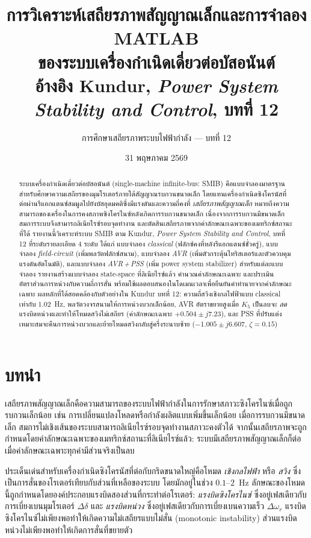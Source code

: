 \documentclass[12pt,a4paper]{article}
\title{\textbf{การวิเคราะห์เสถียรภาพสัญญาณเล็กและการจำลอง MATLAB\\
ของระบบเครื่องกำเนิดเดี่ยวต่อบัสอนันต์}\\
\large อ้างอิง Kundur, \textit{Power System Stability and Control}, บทที่ 12}
\author{การศึกษาเสถียรภาพระบบไฟฟ้ากำลัง --- บทที่ 12}
\date{31 พฤษภาคม 2569}
\newcommand{\dwr}{\Delta\omega_r}
\newcommand{\ddel}{\Delta\delta}
\begin{document}
\maketitle
\thispagestyle{empty}

\begin{abstract}
ระบบเครื่องกำเนิดเดี่ยวต่อบัสอนันต์ (single-machine infinite-bus: SMIB)
คือแบบจำลองมาตรฐานสำหรับศึกษาความเสถียรของมุมโรเตอร์ภายใต้สัญญาณรบกวนขนาดเล็ก
โดยแทนเครื่องกำเนิดซิงโครนัสที่ต่อผ่านรีแอกแตนซ์สมมูลไปยังบัสอุดมคติซึ่งมีแรงดันและความถี่คงที่
\emph{เสถียรภาพสัญญาณเล็ก} หมายถึงความสามารถของเครื่องในการคงสภาพซิงโครไนซ์หลังเกิดการรบกวนขนาดเล็ก
เนื่องจากการรบกวนมีขนาดเล็ก สมการระบบจึงสามารถลิเนียไรซ์รอบจุดทำงาน และตัดสินเสถียรภาพจากค่าลักษณะเฉพาะของเมทริกซ์สถานะที่ได้
รายงานนี้วิเคราะห์ระบบ SMIB ตาม Kundur, \textit{Power System Stability and Control}, บทที่ 12 ที่ระดับรายละเอียด 4 ระดับ ได้แก่
แบบจำลอง \emph{classical} (ฟลักซ์คงที่หลังรีแอกแตนซ์ชั่วครู่),
แบบจำลอง \emph{field-circuit} (เพิ่มพลวัตฟลักซ์สนาม),
แบบจำลอง \emph{AVR} (เพิ่มตัวกระตุ้นไทริสเตอร์และตัวควบคุมแรงดันอัตโนมัติ),
และแบบจำลอง \emph{AVR\,+\,PSS} (เพิ่ม power system stabilizer)
สำหรับแต่ละแบบจำลอง รายงานสร้างแบบจำลอง state-space ที่ลิเนียไรซ์แล้ว คำนวณค่าลักษณะเฉพาะ
และประเมินอัตราส่วนการหน่วงกับความถี่การสั่น พร้อมใช้ผลตอบสนองในโดเมนเวลาเพื่อยืนยันคำทำนายจากค่าลักษณะเฉพาะ
ผลหลักที่ได้สอดคล้องกับตัวอย่างใน Kundur บทที่ 12: ความถี่สวิงเชิงกลไฟฟ้าแบบ classical เท่ากับ $1.02$~Hz,
พลวัตวงจรสนามให้การหน่วงบวกเล็กน้อย,
AVR อัตราขยายสูงเมื่อ $K_5$ เป็นลบจะ \emph{ลด} แรงบิดหน่วงและทำให้โหมดสวิงไม่เสถียร
(ค่าลักษณะเฉพาะ $+0.504\pm j7.23$),
และ PSS ที่ปรับแต่งเหมาะสมจะคืนการหน่วงบวกและย้ายโหมดสวิงกลับสู่ครึ่งระนาบซ้าย
($-1.005\pm j6.607$, $\zeta=0.15$)
\end{abstract}
\newpage
\tableofcontents
\newpage

\section{บทนำ}

เสถียรภาพสัญญาณเล็กคือความสามารถของระบบไฟฟ้ากำลังในการรักษาสภาวะซิงโครไนซ์เมื่อถูกรบกวนเล็กน้อย
เช่น การเปลี่ยนแปลงโหลดหรือกำลังผลิตแบบเพิ่มขึ้นเล็กน้อย
เมื่อการรบกวนมีขนาดเล็ก สมการไม่เชิงเส้นของระบบสามารถลิเนียไรซ์รอบจุดทำงานสภาวะคงตัวได้
จากนั้นเสถียรภาพจะถูกกำหนดโดยค่าลักษณะเฉพาะของเมทริกซ์สถานะที่ลิเนียไรซ์แล้ว:
ระบบมีเสถียรภาพสัญญาณเล็กก็ต่อเมื่อค่าลักษณะเฉพาะทุกค่ามีส่วนจริงเป็นลบ

ประเด็นเด่นสำหรับเครื่องกำเนิดซิงโครนัสที่ต่อกับกริดขนาดใหญ่คือโหมด
\textit{เชิงกลไฟฟ้า} หรือ \textit{สวิง} ซึ่งเป็นการสั่นของโรเตอร์เทียบกับส่วนที่เหลือของระบบ
โดยมักอยู่ในช่วง $0.1$--$2$~Hz
ลักษณะของโหมดนี้ถูกกำหนดโดยองค์ประกอบแรงบิดสองส่วนที่กระทำต่อโรเตอร์:
\textit{แรงบิดซิงโครไนซ์} ซึ่งอยู่เฟสเดียวกับการเบี่ยงเบนมุมโรเตอร์ $\ddel$
และ \textit{แรงบิดหน่วง} ซึ่งอยู่เฟสเดียวกับการเบี่ยงเบนความเร็ว $\dwr$
แรงบิดซิงโครไนซ์ไม่เพียงพอทำให้เกิดความไม่เสถียรแบบไม่สั่น (monotonic instability)
ส่วนแรงบิดหน่วงไม่เพียงพอทำให้เกิดการสั่นที่ขยายตัว
\end{document}
